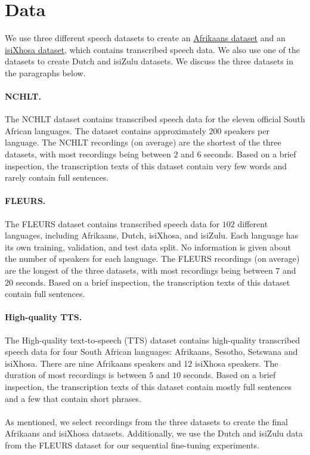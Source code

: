 \section{Data}\label{sec:data}
We use three different speech datasets
to create an \href{https://huggingface.co/datasets/lucas-meyer/asr_af}{Afrikaans dataset} 
and an \href{https://huggingface.co/datasets/lucas-meyer/asr_xh}{isiXhosa dataset}, which contains transcribed speech data.
We also use one of the datasets to create Dutch and isiZulu datasets.
We discuss the three datasets in the paragraphs below.

\paragraph*{NCHLT.}
The NCHLT \cite{barnard2014nchlt} dataset contains transcribed speech data for the eleven official South African languages.
The dataset contains approximately $200$ speakers per language.
The NCHLT recordings (on average) are the shortest of the three datasets, with most recordings being between $2$ and $6$ seconds.
Based on a brief inspection, the transcription texts of this dataset contain very few words and rarely contain full sentences.

\paragraph*{FLEURS.}
The FLEURS \cite{fleurs2022arxiv} dataset contains transcribed speech data for $102$ different languages, including Afrikaans, Dutch, isiXhosa, and isiZulu.
Each language has its own training, validation, and test data split.
No information is given about the number of speakers for each language.
The FLEURS recordings (on average) are the longest of the three datasets, with most recordings being between $7$ and $20$ seconds.
Based on a brief inspection, the transcription texts of this dataset contain full sentences.

\paragraph*{High-quality TTS.}
The High-quality text-to-speech (TTS) \cite{hq2017} dataset contains high-quality transcribed speech data for four South African languages: Afrikaans, Sesotho, Setswana and isiXhosa.
There are nine Afrikaans speakers and 12 isiXhosa speakers.
The duration of most recordings is between $5$ and $10$ seconds.
Based on a brief inspection, the transcription texts of this dataset contain mostly full sentences and a few that contain short phrases.
\\
\\
As mentioned, we select recordings from the three datasets to create the final Afrikaans and isiXhosa datasets.
Additionally, we use the Dutch and isiZulu data from the FLEURS dataset for our sequential fine-tuning experiments.


